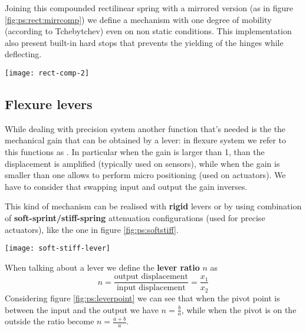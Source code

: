 		Joining this compounded rectilinear spring with a mirrored version (as in figure \ref{fig:ps:rect:mirrcomp}) we define a mechanism with one degree of mobility (according to Tchebytchev) even on non static conditions. This implementation also present built-in hard stops that prevents the yielding of the hinges while deflecting.
		
		\begin{SCfigure}[2][bht]
			\centering
			\texttt{[image: rect-comp-2]}
			\caption{improved compound rectilinear spring from the version in figure \ref{fig:ps:rect:comp} with mobility $M=1$ obtained by joining the original piece with a mirrored copy. The red circles shown the hard stop of motion realized by the frame in order to avoid yielding.}
			\label{fig:ps:rect:mirrcomp}
		\end{SCfigure}
	
	\subsection{Flexure levers}
		While dealing with precision system another function that's needed is the the mechanical gain that can be obtained by a lever: in flexure system we refer to this functions as . In particular when the gain is larger than 1, than the displacement is amplified (typically used on sensors), while when the gain is smaller than one allows to perform micro positioning (used on actuators). We have to consider that swapping input and output the gain inverses.
		
		This kind of mechanism can be realised with \textbf{rigid} levers or by using combination of \textbf{soft-sprint/stiff-spring} attenuation configurations (used for precise actuators), like the one in figure \ref{fig:ps:softstiff}.
		
		\begin{SCfigure}[1][bht]
			\centering
			\texttt{[image: soft-stiff-lever]}
			\caption{example of a soft-spring/stiff-spring attenuation flexure mechanism.}
			\label{fig:ps:softstiff}
		\end{SCfigure}
		
		When talking about a lever we define the \textbf{lever ratio} $n$ as
		\begin{equation}
			n = \frac{\textrm{output displacement}}{\textrm{input displacement}} = \frac{x_1}{x_2}
		\end{equation}
		Considering figure \ref{fig:ps:leverpoint} we can see that when the pivot point is between the input and the output we have $n = \frac ba$, while when the pivot is on the outside the ratio become $n = \frac{a+b}{a}$.
	
